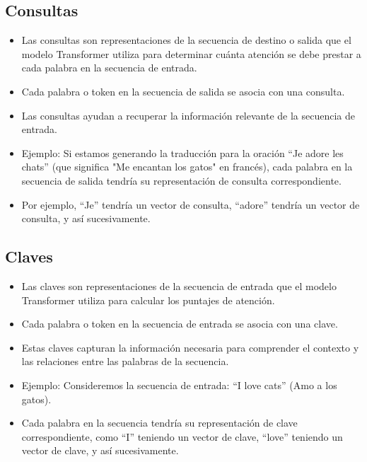 \subsection{Consultas}
\begin{itemize}
\item Las consultas son representaciones de la secuencia de destino o salida que el modelo Transformer utiliza para determinar cuánta atención se debe prestar a cada palabra en la secuencia de entrada.
\item Cada palabra o token en la secuencia de salida se asocia con una consulta.
\item Las consultas ayudan a recuperar la información relevante de la secuencia de entrada.
\item Ejemplo: Si estamos generando la traducción para la oración ``Je adore les chats'' (que significa "Me encantan los gatos" en francés), cada palabra en la secuencia de salida tendría su representación de consulta correspondiente.
\item Por ejemplo, ``Je'' tendría un vector de consulta, ``adore'' tendría un vector de consulta, y así sucesivamente.
\end{itemize}

\subsection{Claves}
\begin{itemize}
\item Las claves son representaciones de la secuencia de entrada que el modelo Transformer utiliza para calcular los puntajes de atención.
\item Cada palabra o token en la secuencia de entrada se asocia con una clave.
\item Estas claves capturan la información necesaria para comprender el contexto y las relaciones entre las palabras de la secuencia.
\item Ejemplo: Consideremos la secuencia de entrada: ``I love cats'' (Amo a los gatos).
\item Cada palabra en la secuencia tendría su representación de clave correspondiente, como ``I'' teniendo un vector de clave, ``love'' teniendo un vector de clave, y así sucesivamente.
\end{itemize}

